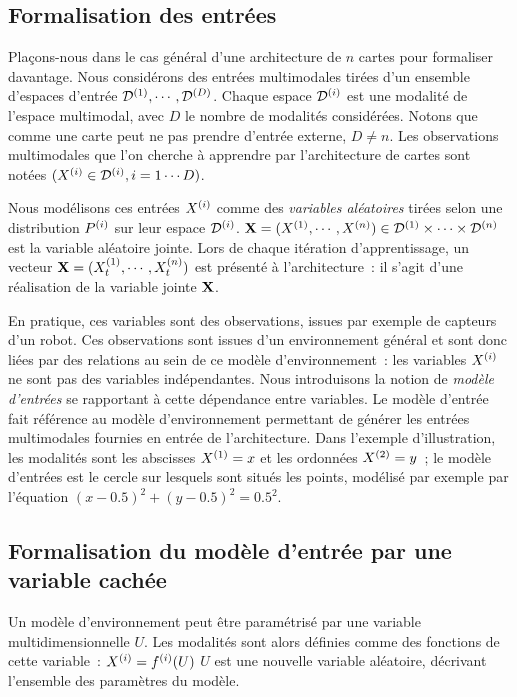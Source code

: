 \documentclass[../main]{subfiles}
\begin{document}
\subsection{Formalisation des entrées}

Plaçons-nous dans le cas général d'une architecture de $n$ cartes pour formaliser davantage.
Nous considérons des entrées multimodales tirées d'un ensemble d'espaces d'entrée $\mathcal{D}^{({1})},\cdots,\mathcal{D}^{({D})}$. Chaque espace $\mathcal{D}^{({i})}$ est une modalité de l'espace multimodal, avec $D$ le nombre de modalités considérées. Notons que comme une carte peut ne pas prendre d'entrée externe, $D \neq n$.
Les observations multimodales que l'on cherche à apprendre par l'architecture de cartes sont notées $(X^{({i})} \in \mathcal{D}^{({i})}, i = 1 \cdots D)$.

Nous modélisons ces entrées $X^{({i})}$ comme des \emph{variables aléatoires} tirées selon une distribution $P^{({i})}$ sur leur espace $\mathcal{D}^{({i})}$.
$\mathbf{X} = (X^{({1})}, \cdots, X^{({n})}) \in \mathcal{D}^{({1})} \times \cdots \times \mathcal{D}^{({n})}$ est la variable aléatoire jointe. 
Lors de chaque itération d'apprentissage, un vecteur $\mathbf{X} = (X^{({1})}_t, \cdots , X^{({n})}_t)$ est présenté à l'architecture~: il s'agit d'une réalisation de la variable jointe $\mathbf{X}$. 

En pratique, ces variables sont des observations, issues par exemple de capteurs d'un robot. Ces observations sont issues d'un environnement général et sont donc liées par des relations au sein de ce modèle d'environnement~: les variables $X^{({i})}$ ne sont pas des variables indépendantes.
Nous introduisons la notion de \emph{modèle d'entrées} se rapportant à cette dépendance entre variables.
Le modèle d'entrée fait référence au modèle d'environnement permettant de générer les entrées multimodales fournies en entrée de l'architecture. Dans l'exemple d'illustration, les modalités sont les abscisses $X^{({1})} = x$ et les ordonnées $X^{({2})} = y$~; le modèle d'entrées est le cercle sur lesquels sont situés les points, modélisé par exemple par l'équation $(x - 0.5)^2 + (y - 0.5)^2 = 0.5^2$.

\subsection{Formalisation du modèle d'entrée par une variable cachée}

Un modèle d'environnement peut être paramétrisé par une variable multidimensionnelle $U$. 
Les modalités sont alors définies comme des fonctions de cette variable~:
$X^{({i})} = f^{({i})}(U)$
$U$ est une nouvelle variable aléatoire, décrivant l'ensemble des paramètres du modèle.
\end{document}
